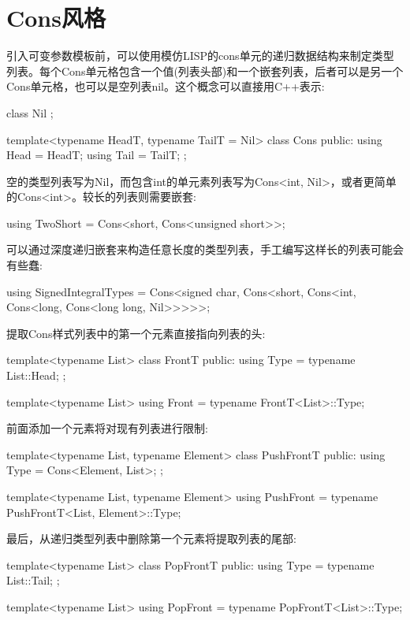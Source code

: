\section{Cons风格}
引入可变参数模板前，可以使用模仿LISP的cons单元的递归数据结构来制定类型列表。每个Cons单元格包含一个值(列表头部)和一个嵌套列表，后者可以是另一个Cons单元格，也可以是空列表nil。这个概念可以直接用C++表示:

\begin{cpp}
class Nil { };

template<typename HeadT, typename TailT = Nil>
class Cons {
	public:
	using Head = HeadT;
	using Tail = TailT;
};
\end{cpp}

空的类型列表写为Nil，而包含int的单元素列表写为Cons<int, Nil>，或者更简单的Cons<int>。较长的列表则需要嵌套:

\begin{cpp}
using TwoShort = Cons<short, Cons<unsigned short>>;
\end{cpp}

可以通过深度递归嵌套来构造任意长度的类型列表，手工编写这样长的列表可能会有些蠢:

\begin{cpp}
using SignedIntegralTypes = Cons<signed char, Cons<short, Cons<int,
							Cons<long, Cons<long long, Nil>>>>>;
\end{cpp}

提取Cons样式列表中的第一个元素直接指向列表的头:

\begin{cpp}
template<typename List>
class FrontT {
	public:
	using Type = typename List::Head;
};

template<typename List>
using Front = typename FrontT<List>::Type;
\end{cpp}

前面添加一个元素将对现有列表进行限制:

\begin{cpp}
template<typename List, typename Element>
class PushFrontT {
	public:
	using Type = Cons<Element, List>;
};

template<typename List, typename Element>
using PushFront = typename PushFrontT<List, Element>::Type;
\end{cpp}

最后，从递归类型列表中删除第一个元素将提取列表的尾部:

\begin{cpp}
template<typename List>
class PopFrontT {
	public:
	using Type = typename List::Tail;
};

template<typename List>
using PopFront = typename PopFrontT<List>::Type;
\end{cpp}

